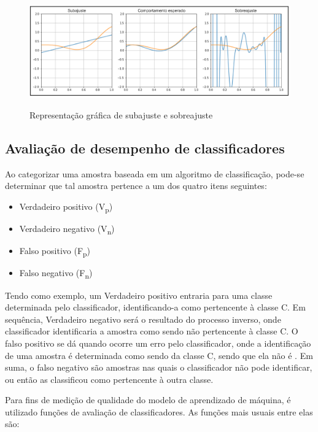 \documentclass[
	12pt,				%
	oneside,			%
	a4paper,			%
	english,			%
	brazil				%
	]{abntex2ppgsi}
\begin{document}
\begin{figure}[H]
    \centering
    \caption{Representação gráfica de subajuste e sobreajuste}
    \includegraphics[scale=.45]{imagens/conceitos_basicos/subajuste_sobreajuste.jpg}
    \label{fig:subajuste_sobreajuste}
\end{figure}

\subsection{Avaliação de desempenho de classificadores}
Ao categorizar uma amostra baseada em um algoritmo de classificação, pode-se determinar que tal amostra pertence a um dos quatro itens seguintes:

\begin{itemize}
  \item Verdadeiro positivo (V\textsubscript{p})
  \item Verdadeiro negativo (V\textsubscript{n})
  \item Falso positivo (F\textsubscript{p})
  \item Falso negativo (F\textsubscript{n})
\end{itemize}

Tendo como exemplo, um Verdadeiro positivo entraria para uma classe determinada pelo classificador, identificando-a como pertencente à classe C. Em sequência, Verdadeiro negativo será o resultado do processo inverso, onde classificador identificaria a amostra como sendo não pertencente à classe C. O falso positivo se dá quando ocorre um erro pelo classificador, onde a identificação de uma amostra é determinada como sendo da classe C, sendo que ela não é . Em suma, o falso negativo são amostras nas quais o classificador não pode identificar, ou então as classificou como pertencente à outra classe.

Para fins de medição de qualidade do modelo de aprendizado de máquina, é utilizado funções de avaliação de classificadores. As funções mais usuais entre elas são:
\end{document}
